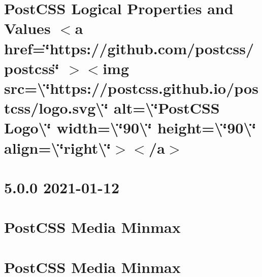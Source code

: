\documentclass[twoside]{book}
\newcommand{\+}{\discretionary{\mbox{\scriptsize$\hookleftarrow$}}{}{}}
\begin{document}
\chapter{Post\+CSS Logical Properties and Values \texorpdfstring{$<$}{<}a href=\char`\"{}https\+://github.\+com/postcss/postcss\char`\"{} \texorpdfstring{$>$}{>}\texorpdfstring{$<$}{<}img src=\textbackslash{}\char`\"{}https\+://postcss.\+github.\+io/postcss/logo.\+svg\textbackslash{}\char`\"{} alt=\textbackslash{}\char`\"{}\+Post\+CSS Logo\textbackslash{}\char`\"{} width=\textbackslash{}\char`\"{}90\textbackslash{}\char`\"{} height=\textbackslash{}\char`\"{}90\textbackslash{}\char`\"{} align=\textbackslash{}\char`\"{}right\textbackslash{}\char`\"{}\texorpdfstring{$>$}{>}\texorpdfstring{$<$}{<}/a\texorpdfstring{$>$}{>}}
\label{md__c___users_vaishnavi_jadhav__desktop__developer_code_mean_stack_example_client_node_modules_postcss_logical__r_e_a_d_m_e}

\chapter{5.0.0 2021-\/01-\/12}
\label{md__c___users_vaishnavi_jadhav__desktop__developer_code_mean_stack_example_client_node_modules_p1d04401b69451f42ad8dfb3663f4c9ec}

\chapter{Post\+CSS Media Minmax}
\label{md__c___users_vaishnavi_jadhav__desktop__developer_code_mean_stack_example_client_node_modules_p139c796e513000cf1f86cb6d94996881}

\chapter{Post\+CSS Media Minmax}
\label{md__c___users_vaishnavi_jadhav__desktop__developer_code_mean_stack_example_client_node_modules_p50c4b0d8883d9529e3a2d0bc76c0e00c}

\end{document}
